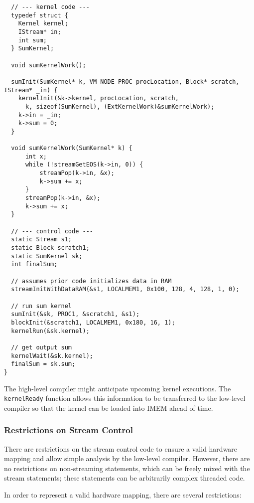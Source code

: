 {\small
\begin{verbatim}
  // --- kernel code ---
  typedef struct {
    Kernel kernel;
    IStream* in;
    int sum;
  } SumKernel;

  void sumKernelWork();
  
  sumInit(SumKernel* k, VM_NODE_PROC procLocation, Block* scratch, IStream* _in) {
    kernelInit(&k->kernel, procLocation, scratch,
      k, sizeof(SumKernel), (ExtKernelWork)&sumKernelWork); 
    k->in = _in;
    k->sum = 0;
  }

  void sumKernelWork(SumKernel* k) {
      int x;
      while (!streamGetEOS(k->in, 0)) {
          streamPop(k->in, &x);
          k->sum += x;
      }
      streamPop(k->in, &x);
      k->sum += x;
  }

  // --- control code ---
  static Stream s1;
  static Block scratch1;
  static SumKernel sk;
  int finalSum;

  // assumes prior code initializes data in RAM
  streamInitWithDataRAM(&s1, LOCALMEM1, 0x100, 128, 4, 128, 1, 0);

  // run sum kernel
  sumInit(&sk, PROC1, &scratch1, &s1);
  blockInit(&scratch1, LOCALMEM1, 0x180, 16, 1);
  kernelRun(&sk.kernel);

  // get output sum
  kernelWait(&sk.kernel);
  finalSum = sk.sum; 
}\end{verbatim}}


The high-level compiler might anticipate upcoming kernel
executions. The {\tt kernelReady} function allows this information to
be transferred to the low-level compiler so that the kernel can be
loaded into IMEM ahead of time.

\subsubsection{Restrictions on Stream Control}

There are restrictions on the stream control code to ensure a valid
hardware mapping and allow simple analysis by the low-level
compiler. However, there are no restrictions on non-streaming
statements, which can be freely mixed with the stream statements;
these statements can be arbitrarily complex threaded code.

In order to represent a valid hardware mapping, there are several restrictions:

